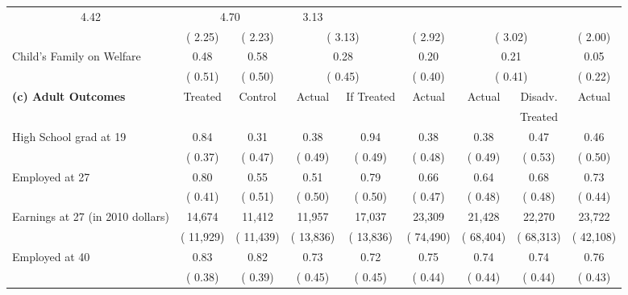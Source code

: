 \begin{table}[htbp]
\begin{center}
\begin{tabular}{lcccccccc}
\multicolumn{1}{c}{         4.42} &
\multicolumn{2}{c}{         4.70} &
\multicolumn{1}{c}{         3.13} 
 \\[0.05cm]  
 & (        2.25) & (        2.23) & \multicolumn{2}{c}{(        3.13)} &
\multicolumn{1}{c}{(        2.92)} &
\multicolumn{2}{c}{(        3.02)} &
\multicolumn{1}{c}{(        2.00)} 
 \\[0.2cm]  
Child's Family on Welfare &         0.48 &         0.58 & \multicolumn{2}{c}{         0.28} &
\multicolumn{1}{c}{         0.20} &
\multicolumn{2}{c}{         0.21} &
\multicolumn{1}{c}{         0.05} 
 \\[0.05cm]  
 & (        0.51) & (        0.50) & \multicolumn{2}{c}{(        0.45)} &
\multicolumn{1}{c}{(        0.40)} &
\multicolumn{2}{c}{(        0.41)} &
\multicolumn{1}{c}{(        0.22)} 
 \\[0.2cm]  
\hline
\textbf{(c) Adult Outcomes} &Treated &Control  &Actual &If Treated &Actual &Actual &Disadv. &Actual \\[0.02cm] 
 & &  && & & & Treated & \\[0.2cm] 
High School grad at 19 &         0.84 &         0.31 &         0.38 &         0.94 &         0.38 &         0.38 &         0.47 &         0.46 \\[0.05cm]  
 & (        0.37) & (        0.47) & (        0.49) & (        0.49) & (        0.48) & (        0.49) & (        0.53) & (        0.50)   \\[0.2cm]  
Employed at 27 &         0.80 &         0.55 &         0.51 &         0.79 &         0.66 &         0.64 &         0.68 &         0.73 \\[0.05cm]  
 & (        0.41) & (        0.51) & (        0.50) & (        0.50) & (        0.47) & (        0.48) & (        0.48) & (        0.44)   \\[0.2cm]  
Earnings at 27 (in 2010 dollars) &       14,674 &       11,412 &       11,957 &       17,037 &       23,309 &       21,428 &       22,270 &       23,722 \\[0.05cm]  
 & (      11,929) & (      11,439) & (      13,836) & (      13,836) & (      74,490) & (      68,404) & (      68,313) & (      42,108)   \\[0.2cm]  
Employed at 40 &         0.83 &         0.82 &         0.73 &         0.72 &         0.75 &         0.74 &         0.74 &         0.76 \\[0.05cm]  
 & (        0.38) & (        0.39) & (        0.45) & (        0.45) & (        0.44) & (        0.44) & (        0.44) & (        0.43)   \\[0.2cm]  

\end{tabular}
\end{center}
\end{table}
